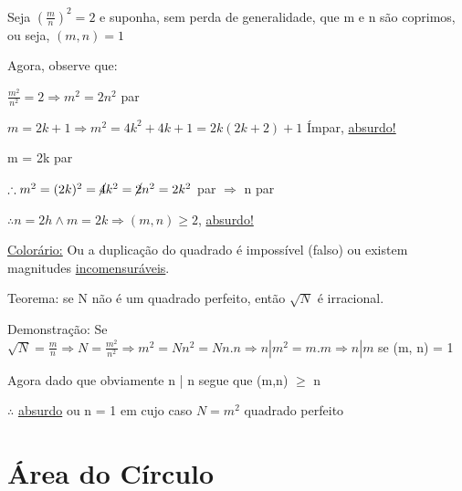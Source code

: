 \documentclass[a4paper, 12pt]{article}
\begin{document}
    {Seja $(\frac{m}{n})^2 = 2$ e suponha, sem perda de generalidade, que m e n são coprimos, ou seja, $(m,n)=1$}
    
    Agora, observe que:
    
    \begin{center}
    $\frac{m^2}{n^2} = 2 \Rightarrow m^2 = 2n^2$ par 
    \newline
    
    $m = 2k + 1 \Rightarrow m^2 = 4k^2 + 4k + 1 = 2k(2k + 2) + 1$ Ímpar, \underline{absurdo!}
    
    {m = 2k par}
    
    $\therefore m^2 = (2k)^2 = \cancel{4}k^2 = \cancel{2}n^2 = 2k^2$ par $\Rightarrow$ n par
    \newline
    
    $\therefore n = 2h \wedge  m = 2k \Rightarrow (m,n) \ge 2$, \underline{absurdo!}
    \newline
    \end{center}
    
    \underline{Colorário:} Ou a duplicação do quadrado é impossível (falso) ou existem magnitudes \underline{incomensuráveis}.
    \newline
    
    Teorema: se N não é um quadrado perfeito, então $\sqrt{N}$ é irracional.
    \newline
    
    Demonstração: Se $\sqrt{N} = \frac{m}{n} \Rightarrow N = \frac{m^2}{n^2} \Rightarrow m^2 = Nn^2 = Nn.n \Rightarrow n | m^2 = m.m \Rightarrow n | m$ se (m, n) = 1 
    \newline
    
    Agora dado que obviamente n | n segue que (m,n) $\ge$ n
    \newline
    
    $\therefore$ \underline{absurdo} ou n = 1 em cujo caso $N = m^2$ quadrado perfeito
    
    \newpage
    \section{Área do Círculo}
\end{document}
